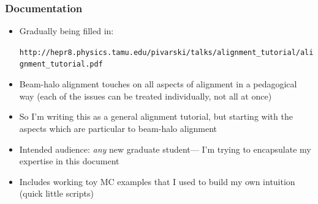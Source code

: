 \documentclass[compress]{beamer}
\begin{document}


\begin{frame}
\frametitle{Documentation}

\begin{itemize}
\item Gradually being filled in:

{\tiny \tt http://hepr8.physics.tamu.edu/pivarski/talks/alignment\_tutorial/alignment\_tutorial.pdf}

\item Beam-halo alignment touches on all aspects of alignment in a
  pedagogical way (each of the issues can be treated individually, not
  all at once)

\item So I'm writing this as a general alignment tutorial, but
  starting with the aspects which are particular to beam-halo alignment

\item Intended audience: {\it any} new graduate student--- I'm trying
  to encapsulate my expertise in this document

\item Includes working toy MC examples that I used to build my own intuition (quick little scripts)

\end{itemize}
\end{frame}
\end{document}
